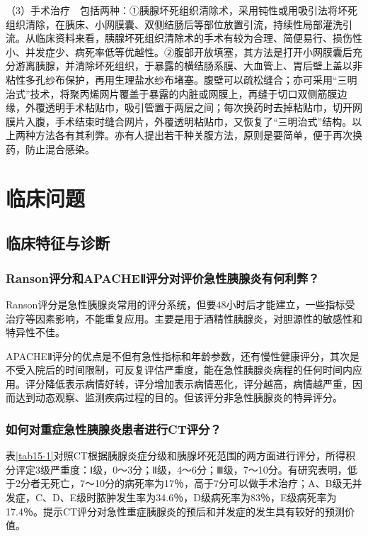（3）手术治疗　包括两种：①胰腺坏死组织清除术，采用钝性或用吸引法将坏死组织清除，在胰床、小网膜囊、双侧结肠后等部位放置引流，持续性局部灌洗引流。从临床资料来看，胰腺坏死组织清除术的手术有较为合理、简便易行、损伤性小、并发症少、病死率低等优越性。②腹部开放填塞，其方法是打开小网膜囊后充分游离胰腺，并清除坏死组织，于暴露的横结肠系膜、大血管上、胃后壁上盖以非粘性多孔纱布保护，再用生理盐水纱布堵塞。腹壁可以疏松缝合；亦可采用“三明治式”技术，将聚丙烯网片覆盖于暴露的内脏或网膜上，再缝于切口双侧筋膜边缘，外覆透明手术粘贴巾，吸引管置于两层之间；每次换药时去掉粘贴巾，切开网膜片入腹，手术结束时缝合网片，外覆透明粘贴巾，又恢复了“三明治式”结构。以上两种方法各有其利弊。亦有人提出若干种关腹方法，原则是要简单，便于再次换药，防止混合感染。

\section{临床问题}

\subsection{临床特征与诊断}

\subsubsection{Ranson评分和APACHEⅡ评分对评价急性胰腺炎有何利弊？}

Ranson评分是急性胰腺炎常用的评分系统，但要48小时后才能建立，一些指标受治疗等因素影响，不能重复应用。主要是用于酒精性胰腺炎，对胆源性的敏感性和特异性不佳。

APACHEⅡ评分的优点是不但有急性指标和年龄参数，还有慢性健康评分，其次是不受入院后的时间限制，可反复评估严重度，能在急性胰腺炎病程的任何时间内应用。评分降低表示病情好转，评分增加表示病情恶化，评分越高，病情越严重，因而达到动态观察、监测疾病过程的目的。但该评分非急性胰腺炎的特异评分。

\subsubsection{如何对重症急性胰腺炎患者进行CT评分？}

表\ref{tab15-1}对照CT根据胰腺炎症分级和胰腺坏死范围的两方面进行评分，所得积分评定3级严重度：Ⅰ级，0～3分；Ⅱ级，4～6分；Ⅲ级，7～10分。有研究表明，低于2分者无死亡，7～10分的病死率为17％，高于7分可以做手术治疗；A、B级无并发症，C、D、E级时脓肿发生率为34.6％，D级病死率为83％，E级病死率为17.4％。提示CT评分对急性重症胰腺炎的预后和并发症的发生具有较好的预测价值。

